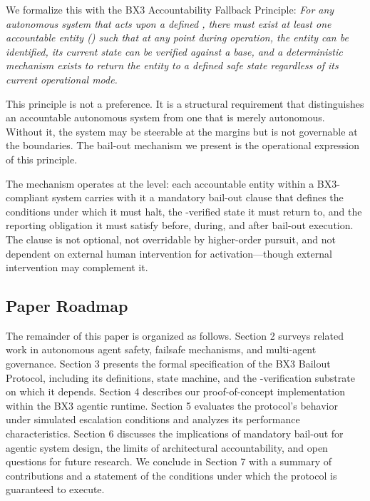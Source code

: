 We formalize this with the BX3 Accountability Fallback Principle: \textit{For any autonomous system that acts upon a defined \purpose, there must exist at least one accountable entity (\bxthree) such that at any point during operation, the entity can be identified, its current state can be verified against a \fact base, and a deterministic mechanism exists to return the entity to a defined safe state regardless of its current operational mode.}

This principle is not a preference. It is a structural requirement that distinguishes an accountable autonomous system from one that is merely autonomous. Without it, the system may be steerable at the margins but is not governable at the boundaries. The bail-out mechanism we present is the operational expression of this principle.

The mechanism operates at the \bxthree level: each accountable entity within a BX3-compliant system carries with it a mandatory bail-out clause that defines the conditions under which it must halt, the \fact-verified state it must return to, and the reporting obligation it must satisfy before, during, and after bail-out execution. The clause is not optional, not overridable by higher-order \purpose pursuit, and not dependent on external human intervention for activation—though external intervention may complement it.

\subsection{Paper Roadmap}

The remainder of this paper is organized as follows. Section 2 surveys related work in autonomous agent safety, failsafe mechanisms, and multi-agent governance. Section 3 presents the formal specification of the BX3 Bailout Protocol, including its definitions, state machine, and the \fact-verification substrate on which it depends. Section 4 describes our proof-of-concept implementation within the BX3 agentic runtime. Section 5 evaluates the protocol's behavior under simulated escalation conditions and analyzes its performance characteristics. Section 6 discusses the implications of mandatory bail-out for agentic system design, the limits of architectural accountability, and open questions for future research. We conclude in Section 7 with a summary of contributions and a statement of the conditions under which the protocol is guaranteed to execute.